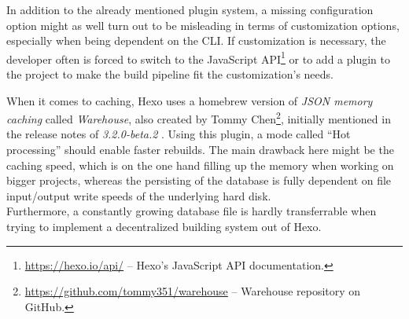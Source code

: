 In addition to the already mentioned plugin system, a missing configuration option might as well turn out to be misleading in terms of customization options, especially when being dependent on the CLI. If customization is necessary, the developer often is forced to switch to the JavaScript API\footnote{\url{https://hexo.io/api/} -- Hexo's JavaScript API documentation.} or to add a plugin to the project to make the build pipeline fit the customization's needs.

When it comes to caching, Hexo uses a homebrew version of \emph{JSON memory caching} called \emph{Warehouse}, also created by Tommy Chen\footnote{\url{https://github.com/tommy351/warehouse} -- Warehouse repository on GitHub.}, initially mentioned in the release notes of \emph{3.2.0-beta.2} \cite{Chen2015hexorelease}. Using this plugin, a mode called ``Hot processing'' should enable faster rebuilds. The main drawback here might be the caching speed, which is on the one hand filling up the memory when working on bigger projects, whereas the persisting of the database is fully dependent on file input/output write speeds of the underlying hard disk.\\
Furthermore, a constantly growing database file is hardly transferrable when trying to implement a decentralized building system out of Hexo.
